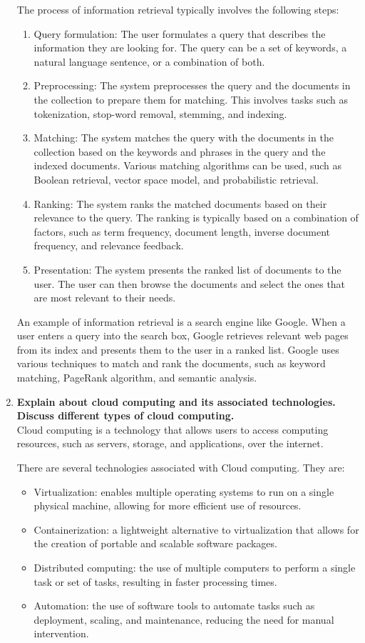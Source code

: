 \documentclass[12pt]{article}
\begin{document}
\begin{enumerate}
The process of information retrieval typically involves the following steps:
\begin{enumerate}
    \item Query formulation: The user formulates a query that describes the information they are looking for. The query can be a set of keywords, a natural language sentence, or a combination of both.
    \item Preprocessing: The system preprocesses the query and the documents in the collection to prepare them for matching. This involves tasks such as tokenization, stop-word removal, stemming, and indexing.
    \item Matching: The system matches the query with the documents in the collection based on the keywords and phrases in the query and the indexed documents. Various matching algorithms can be used, such as Boolean retrieval, vector space model, and probabilistic retrieval.
    \item Ranking: The system ranks the matched documents based on their relevance to the query. The ranking is typically based on a combination of factors, such as term frequency, document length, inverse document frequency, and relevance feedback.
    \item Presentation: The system presents the ranked list of documents to the user. The user can then browse the documents and select the ones that are most relevant to their needs.
\end{enumerate}

An example of information retrieval is a search engine like Google. When a user enters a query into the search box, Google retrieves relevant web pages from its index and presents them to the user in a ranked list. Google uses various techniques to match and rank the documents, such as keyword matching, PageRank algorithm, and semantic analysis.
\item{\bfseries Explain about cloud computing and its associated technologies. Discuss different types of cloud computing.\\}
Cloud computing is a technology that allows users to access computing resources, such as servers, storage, and applications, over the internet. 
    
    There are several technologies associated with Cloud computing. They are:
    \begin{itemize}
        \item Virtualization: enables multiple operating systems to run on a single physical machine, allowing for more efficient use of resources.
        \item Containerization: a lightweight alternative to virtualization that allows for the creation of portable and scalable software packages.
        \item Distributed computing: the use of multiple computers to perform a single task or set of tasks, resulting in faster processing times.
        \item Automation: the use of software tools to automate tasks such as deployment, scaling, and maintenance, reducing the need for manual intervention.
    \end{itemize}
    

\end{enumerate}
\end{document}
